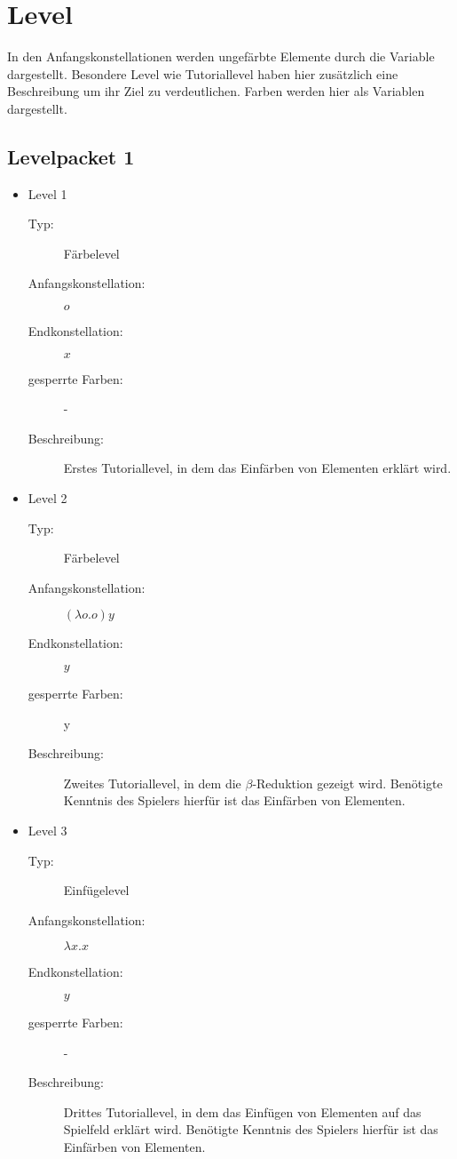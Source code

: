\chapter{Level}
In den Anfangskonstellationen werden ungefärbte Elemente durch die Variable  dargestellt. 
Besondere Level wie Tutoriallevel haben hier zusätzlich eine Beschreibung um ihr Ziel zu verdeutlichen.
Farben werden hier als Variablen dargestellt.

\section{Levelpacket 1}
\begin{itemize}
	\item{Level 1} 
		\begin{description}
			\item[Typ:] Färbelevel 
			\item[Anfangskonstellation:] \( o\)
			\item[Endkonstellation:] \( x\)
			\item[gesperrte Farben:] -  
			\item[Beschreibung:] Erstes Tutoriallevel, in dem das Einfärben von Elementen erklärt wird.
		\end{description}

	\item{Level 2} 
		\begin{description}
			\item[Typ:] Färbelevel 
			\item[Anfangskonstellation:] \((\lambda o . o ) y\)   
			\item[Endkonstellation:] \(y\) 
			\item[gesperrte Farben:] y 
			\item[Beschreibung:] Zweites Tutoriallevel, in dem die \(\beta\)-Reduktion gezeigt wird.
								Benötigte Kenntnis des Spielers hierfür ist das Einfärben von Elementen. 
		\end{description}

	\item{Level 3} 
		\begin{description}
			\item[Typ:] Einfügelevel 
			\item[Anfangskonstellation:] \(\lambda x . x \)   
			\item[Endkonstellation:] \(y\)
			\item[gesperrte Farben:] -  
			\item[Beschreibung:] Drittes Tutoriallevel, in dem das Einfügen von Elementen auf das Spielfeld erklärt wird.
								Benötigte Kenntnis des Spielers hierfür ist das Einfärben von Elementen. 
		\end{description}


\end{itemize}
